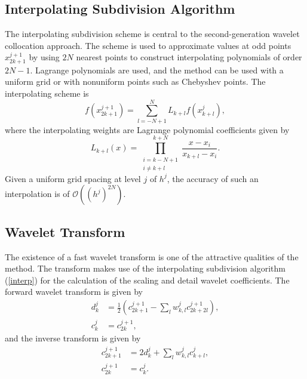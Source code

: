 \documentclass[11pt]{article}
\begin{document}
\subsection{Interpolating Subdivision Algorithm}
The interpolating subdivision scheme is central to the second-generation wavelet collocation approach. The scheme is used to
approximate values at odd points $x_{2k+1}^{j+1}$ by using $2N$ nearest points to construct interpolating polynomials of 
order $2N-1$. Lagrange polynomials are used, and the method can be used with a uniform grid or with 
nonuniform points such as Chebyshev points. The interpolating scheme is 
\begin{equation}
    f(x_{2k+1}^{j+1})=\sum_{l=-N+1}^{N} L_{k+l} f(x_{k+l}^{j}), \label{interp}
\end{equation}
where the interpolating weights are Lagrange polynomial coefficients given by 
\begin{equation}
    L_{k+l}(x)=\prod_{ \substack{ i=k-N+1 \\ i\neq k+l } }^{k+N} \frac{x-x_i}{x_{k+l}-x_i}.
\end{equation}
Given a uniform grid spacing at level $j$ of $h^j$, the accuracy of such an interpolation is of $\mathcal{O}((h^{j})^{2N})$.  

\subsection{Wavelet Transform}
The existence of a fast wavelet transform is one of the attractive qualities of the method. The transform makes use of the 
interpolating subdivision algorithm (\ref{interp}) for the calculation of the scaling and detail wavelet coefficients. The forward wavelet transform is given by
\begin{equation}
	\begin{split}
		d_{k}^{j} &= \frac{1}{2} \left( c_{2k+1}^{j+1}-\sum_{l} w_{k,l}^{j} c_{2k+2l}^{j+1} \right), \\
		c_{k}^{j} &= c_{2k}^{j+1},
	\end{split}
\end{equation}
and the inverse transform is given by 
\begin{equation}
	\begin{split}
		c_{2k+1}^{j+1} &= 2 d_{k}^{j}  + \sum_{l} w_{k,l}^{j} c_{k+l}^{j}, \\
		c_{2k}^{j+1} &= c_{k}^{j}.
	\end{split}
\end{equation}
\end{document}
